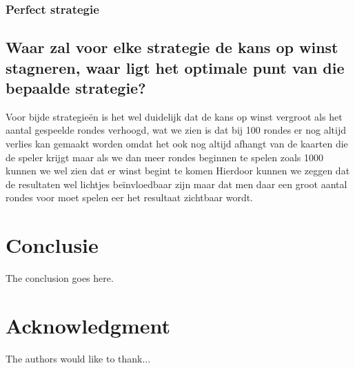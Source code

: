 \documentclass[conference]{IEEEtran}
\begin{document}
\subsubsection{Perfect strategie}

\subsection{ Waar zal voor elke strategie de kans op winst stagneren, waar ligt het optimale punt van die bepaalde strategie?}
Voor bijde strategieën is het wel duidelijk dat de kans op winst vergroot als het aantal gespeelde rondes verhoogd, wat we zien is dat bij 100 rondes er nog altijd verlies kan gemaakt worden omdat het ook nog altijd afhangt van de kaarten die de speler krijgt maar als we dan meer rondes beginnen te spelen zoals 1000 kunnen we wel zien dat er winst begint te komen Hierdoor kunnen we zeggen dat de resultaten wel lichtjes beïnvloedbaar zijn maar dat men daar een groot aantal rondes voor moet spelen eer het resultaat zichtbaar wordt. 
\section{Conclusie}
The conclusion goes here.

\section*{Acknowledgment}

The authors would like to thank...

\end{document}
